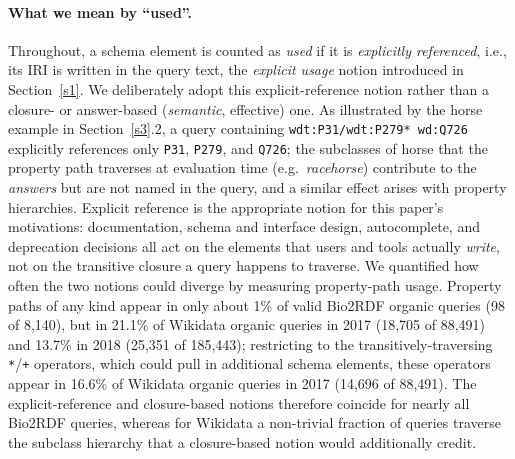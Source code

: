\documentclass[sw]{iosart2x}
\begin{document}
\paragraph{\textbf{What we mean by ``used''.}} Throughout, a schema element is counted as \emph{used} if it is \emph{explicitly referenced}, i.e., its IRI is written in the query text, the \emph{explicit usage} notion introduced in Section~\ref{s1}. We deliberately adopt this explicit-reference notion rather than a closure- or answer-based (\emph{semantic}, effective) one. As illustrated by the horse example in Section~\ref{s3}.2, a query containing \texttt{wdt:P31/wdt:P279* wd:Q726} explicitly references only \texttt{P31}, \texttt{P279}, and \texttt{Q726}; the subclasses of horse that the property path traverses at evaluation time (e.g.\ \emph{racehorse}) contribute to the \emph{answers} but are not named in the query, and a similar effect arises with property hierarchies. Explicit reference is the appropriate notion for this paper's motivations: documentation, schema and interface design, autocomplete, and deprecation decisions all act on the elements that users and tools actually \emph{write}, not on the transitive closure a query happens to traverse. We quantified how often the two notions could diverge by measuring property-path usage. Property paths of any kind appear in only about 1\% of valid Bio2RDF organic queries (98 of 8,140), but in 21.1\% of Wikidata organic queries in 2017 (18,705 of 88,491) and 13.7\% in 2018 (25,351 of 185,443); restricting to the transitively-traversing \texttt{*}/\texttt{+} operators, which could pull in additional schema elements, these operators appear in 16.6\% of Wikidata organic queries in 2017 (14,696 of 88,491). The explicit-reference and closure-based notions therefore coincide for nearly all Bio2RDF queries, whereas for Wikidata a non-trivial fraction of queries traverse the subclass hierarchy that a closure-based notion would additionally credit.
\end{document}

